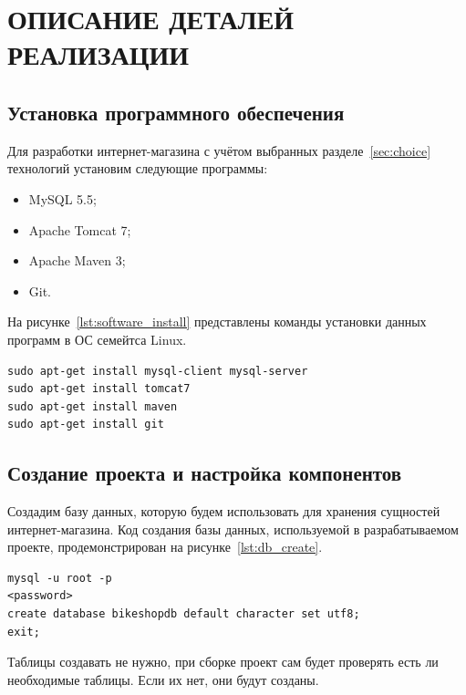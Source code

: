 \section[Описание деталей реализации]{ОПИСАНИЕ ДЕТАЛЕЙ РЕАЛИЗАЦИИ}

\subsection{Установка программного обеспечения}
\label{sub:realization_software_install}

Для разработки интернет-магазина с учётом выбранных разделе~\ref{sec:choice}
технологий установим следующие программы:

\begin{itemize}
  \item MySQL 5.5;
  \item Apache Tomcat 7;
  \item Apache Maven 3;
  \item Git.
\end{itemize}

На рисунке~\ref{lst:software_install} представлены команды установки данных
программ в ОС семейтса Linux.

\begin{lstlisting}[caption=Команды установки необходимого программного обеспечения,label=lst:software_install]
sudo apt-get install mysql-client mysql-server
sudo apt-get install tomcat7
sudo apt-get install maven
sudo apt-get install git
\end{lstlisting}


\subsection{Создание проекта и настройка компонентов}

Создадим базу данных, которую будем использовать для хранения сущностей интернет-магазина.
Код создания базы данных, используемой в разрабатываемом проекте,
продемонстрирован на рисунке~\ref{lst:db_create}.

\begin{lstlisting}[caption=Команды создания базы данных для проекта,label=lst:db_create]
mysql -u root -p
<password>
create database bikeshopdb default character set utf8;
exit;
\end{lstlisting}

Таблицы создавать не нужно, при сборке проект сам будет проверять есть ли
необходимые таблицы. Если их нет, они будут созданы.

